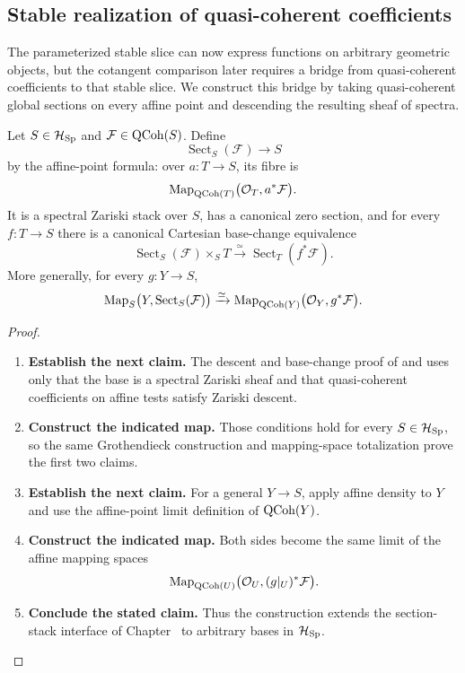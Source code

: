 \subsection{Stable realization of quasi-coherent coefficients}

The parameterized stable slice can now express functions on arbitrary
geometric objects, but the cotangent comparison later requires a bridge from
quasi-coherent coefficients to that stable slice. We construct this bridge by
taking quasi-coherent global sections on every affine point and descending the
resulting sheaf of spectra.

\begin{construction}
\label{con:section-stack-spectral-stack}
Let \(S\in\mathcal H_{\operatorname{Sp}}\) and \(\mathcal F\in\operatorname{QCoh}(S)\). Define
\[
  \operatorname{Sect}_S(\mathcal F)\longrightarrow S
\]
by the affine-point formula: over \(a:T\to S\), its fibre is
\[
  \operatorname{Map}_{\operatorname{QCoh}(T)}
  \bigl(\mathcal O_T,a^*\mathcal F\bigr).
\]
It is a spectral Zariski stack over \(S\), has a canonical zero section, and for
every \(f:T\to S\) there is a canonical Cartesian base-change equivalence
\[
  \operatorname{Sect}_S(\mathcal F)\times_ST
  \xrightarrow{\simeq}
  \operatorname{Sect}_T(f^*\mathcal F).
\]
More generally, for every \(g:Y\to S\),
\[
  \operatorname{Map}_S\bigl(Y,\operatorname{Sect}_S(\mathcal F)\bigr)
  \xrightarrow{\simeq}
  \operatorname{Map}_{\operatorname{QCoh}(Y)}\bigl(\mathcal O_Y,g^*\mathcal F\bigr).
\]
\end{construction}

\begin{proof}
\leavevmode
\begin{enumerate}[label=\textup{(\arabic*)}]
    \item \textbf{Establish the next claim.}
    The descent and base-change proof of
     and
     uses only that the base is a spectral
    Zariski sheaf and that quasi-coherent coefficients on affine tests satisfy Zariski
    descent.
    \item \textbf{Construct the indicated map.}
    Those conditions hold for every \(S\in\mathcal H_{\operatorname{Sp}}\), so the
    same Grothendieck construction and mapping-space totalization prove the first two
    claims.
    \item \textbf{Establish the next claim.}
    For a general \(Y\to S\), apply affine density to \(Y\) and use the
    affine-point limit definition of \(\operatorname{QCoh}(Y)\).
    \item \textbf{Construct the indicated map.}
    Both sides become the same limit of
    the affine mapping spaces
    \[
    \operatorname{Map}_{\operatorname{QCoh}(U)}\bigl(\mathcal O_U,(g|_U)^*\mathcal F\bigr).
    \]
    \item \textbf{Conclude the stated claim.}
    Thus the construction extends the section-stack interface of
    Chapter~ to arbitrary bases in
    \(\mathcal H_{\operatorname{Sp}}\).
\end{enumerate}
\end{proof}

